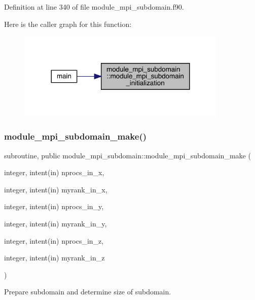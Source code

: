 Definition at line 340 of file module\+\_\+mpi\+\_\+subdomain.\+f90.

Here is the caller graph for this function\+:\nopagebreak
\begin{figure}[H]
\begin{center}
\leavevmode
\includegraphics[width=284pt]{namespacemodule__mpi__subdomain_a0be56ce2507138a1364de11e15f2bc7f_icgraph}
\end{center}
\end{figure}
\mbox{\label{namespacemodule__mpi__subdomain_a6387e08f00a18fad06417aa9b51854ac}} 
\subsubsection{\texorpdfstring{module\_mpi\_subdomain\_make()}{module\_mpi\_subdomain\_make()}}
{\footnotesize\ttfamily subroutine, public module\+\_\+mpi\+\_\+subdomain\+::module\+\_\+mpi\+\_\+subdomain\+\_\+make (\begin{DoxyParamCaption}\item[{integer, intent(in)}]{nprocs\+\_\+in\+\_\+x,  }\item[{integer, intent(in)}]{myrank\+\_\+in\+\_\+x,  }\item[{integer, intent(in)}]{nprocs\+\_\+in\+\_\+y,  }\item[{integer, intent(in)}]{myrank\+\_\+in\+\_\+y,  }\item[{integer, intent(in)}]{nprocs\+\_\+in\+\_\+z,  }\item[{integer, intent(in)}]{myrank\+\_\+in\+\_\+z }\end{DoxyParamCaption})}



Prepare subdomain and determine size of subdomain. 


